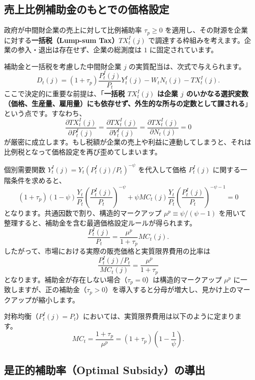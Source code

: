 \documentclass[
  japanese,
  lualatex,
  ja=standard,
  12pt,
  a4paper]{ltjsarticle}
\begin{document}
\subsection{売上比例補助金のもとでの価格設定}\label{ux58f2ux4e0aux6bd4ux4f8bux88dcux52a9ux91d1ux306eux3082ux3068ux3067ux306eux4fa1ux683cux8a2dux5b9a}

政府が中間財企業の売上に対して比例補助率 \(\tau_p \geq 0\)
を適用し、その財源を企業に対する\textbf{一括税（Lump-sum
Tax）\(TX_t^I(j)\)}
で調達する枠組みを考えます。企業の参入・退出は存在せず、企業の総測度は
\(1\) に固定されています。

補助金と一括税を考慮した中間財企業 \(j\)
の実質配当は、次式で与えられます。 \[
D_t(j) = (1+\tau_p) \frac{P_t^I(j)}{P_t} Y_t^I(j) - W_t N_t(j) - TX_t^I(j).
\] ここで決定的に重要な前提は、「\textbf{一括税 \(TX_t^I(j)\) は企業
\(j\)
のいかなる選択変数（価格、生産量、雇用量）にも依存せず、外生的な所与の定数として課される}」という点です。すなわち、
\[
\frac{\partial TX_t^I(j)}{\partial P_t^I(j)} = \frac{\partial TX_t^I(j)}{\partial Y_t^I(j)} = \frac{\partial TX_t^I(j)}{\partial N_t(j)} = 0
\]
が厳密に成立します。もし税額が企業の売上や利益に連動してしまうと、それは比例税となって価格設定を再び歪めてしまいます。

個別需要関数 \(Y_t^I(j) = Y_t (P_t^I(j)/P_t)^{-\psi}\) を代入して価格
\(P_t^I(j)\) に関する一階条件を求めると、 \[
(1+\tau_p)(1-\psi) \frac{Y_t}{P_t} \left( \frac{P_t^I(j)}{P_t} \right)^{-\psi} + \psi MC_t(j) \frac{Y_t}{P_t} \left( \frac{P_t^I(j)}{P_t} \right)^{-\psi - 1} = 0
\] となります。共通因数で割り、構造的マークアップ
\(\mu^p \equiv \psi/(\psi-1)\)
を用いて整理すると、補助金を含む最適価格設定ルールが得られます。 \[
\frac{P_t^I(j)}{P_t} = \frac{\mu^p}{1+\tau_p} MC_t(j).
\] したがって、市場における実際の販売価格と実質限界費用の比率は \[
\frac{P_t^I(j)/P_t}{MC_t(j)} = \frac{\mu^p}{1+\tau_p}
\]
となります。補助金が存在しない場合（\(\tau_p = 0\)）は構造的マークアップ
\(\mu^p\)
に一致しますが、正の補助金（\(\tau_p > 0\)）を導入すると分母が増大し、見かけ上のマークアップが縮小します。

対称均衡（\(P_t^I(j) = P_t\)）においては、実質限界費用は以下のように定まります。
\[
MC_t = \frac{1+\tau_p}{\mu^p} = (1+\tau_p) \left( 1 - \frac{1}{\psi} \right).
\]

\subsection{是正的補助率（Optimal
Subsidy）の導出}\label{ux662fux6b63ux7684ux88dcux52a9ux7387optimal-subsidyux306eux5c0eux51fa}
\end{document}
